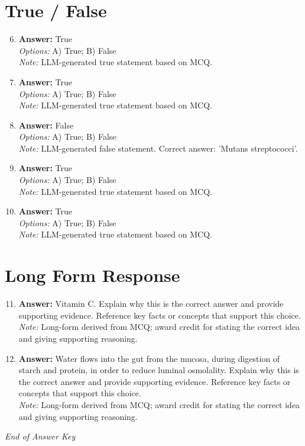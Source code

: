\documentclass[12pt]{article}
\begin{document}
\section*{True / False}
\begin{enumerate}[label=\arabic*.]
\setcounter{enumi}{5}
\item \textbf{Answer:} True
\\ \textit{Options:} A) True; B) False
\\ \textit{Note:} LLM-generated true statement based on MCQ.
\item \textbf{Answer:} True
\\ \textit{Options:} A) True; B) False
\\ \textit{Note:} LLM-generated true statement based on MCQ.
\item \textbf{Answer:} False
\\ \textit{Options:} A) True; B) False
\\ \textit{Note:} LLM-generated false statement. Correct answer: 'Mutans streptococci'.
\item \textbf{Answer:} True
\\ \textit{Options:} A) True; B) False
\\ \textit{Note:} LLM-generated true statement based on MCQ.
\item \textbf{Answer:} True
\\ \textit{Options:} A) True; B) False
\\ \textit{Note:} LLM-generated true statement based on MCQ.
\end{enumerate}

\section*{Long Form Response}
\begin{enumerate}[label=\arabic*.]
\setcounter{enumi}{10}
\item \textbf{Answer:} Vitamin C. Explain why this is the correct answer and provide supporting evidence. Reference key facts or concepts that support this choice.
\\ \textit{Note:} Long-form derived from MCQ; award credit for stating the correct idea and giving supporting reasoning.
\item \textbf{Answer:} Water flows into the gut from the mucosa, during digestion of starch and protein, in order to reduce luminal osmolality. Explain why this is the correct answer and provide supporting evidence. Reference key facts or concepts that support this choice.
\\ \textit{Note:} Long-form derived from MCQ; award credit for stating the correct idea and giving supporting reasoning.
\end{enumerate}

\vfill
\noindent\textit{End of Answer Key}
\end{document}
